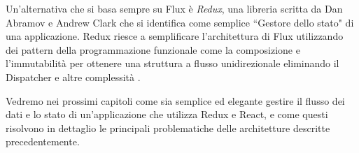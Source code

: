 Un'alternativa che si basa sempre su Flux è \textit{Redux}, una libreria scritta da Dan Abramov e Andrew Clark che si identifica come semplice “Gestore dello stato" di una applicazione. Redux riesce a semplificare l'architettura di Flux utilizzando dei pattern della programmazione funzionale come la composizione e l'immutabilità per ottenere una struttura a flusso unidirezionale eliminando il Dispatcher e altre complessità \cite{AbramovOnReduxVsFlux}.

Vedremo nei prossimi capitoli come sia semplice ed elegante gestire il flusso dei dati e lo stato di un'applicazione che utilizza Redux e React, e come questi risolvono in dettaglio le principali problematiche delle architetture descritte precedentemente.